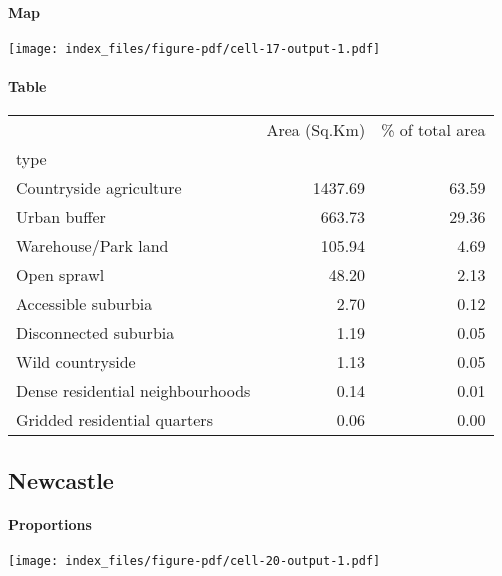 \documentclass[
  letterpaper,
  DIV=11,
  numbers=noendperiod,
  oneside]{scrartcl}
\let\oldparagraph\paragraph
\renewcommand{\paragraph}[1]{\oldparagraph{#1}\mbox{}}
\begin{document}
\hypertarget{map-2}{%
\paragraph{Map}\label{map-2}}

\texttt{[image: index\_files/figure-pdf/cell-17-output-1.pdf]}

\hypertarget{table-2}{%
\paragraph{Table}\label{table-2}}

\begin{tabular}{lrr}
\toprule
{} &  Area (Sq.Km) &  \% of total area \\
type                             &               &                  \\
\midrule
Countryside agriculture          &       1437.69 &            63.59 \\
Urban buffer                     &        663.73 &            29.36 \\
Warehouse/Park land              &        105.94 &             4.69 \\
Open sprawl                      &         48.20 &             2.13 \\
Accessible suburbia              &          2.70 &             0.12 \\
Disconnected suburbia            &          1.19 &             0.05 \\
Wild countryside                 &          1.13 &             0.05 \\
Dense residential neighbourhoods &          0.14 &             0.01 \\
Gridded residential quarters     &          0.06 &             0.00 \\
\bottomrule
\end{tabular}

\hypertarget{newcastle}{%
\subsection{Newcastle}\label{newcastle}}

\hypertarget{proportions-3}{%
\paragraph{Proportions}\label{proportions-3}}

\texttt{[image: index\_files/figure-pdf/cell-20-output-1.pdf]}
\end{document}
